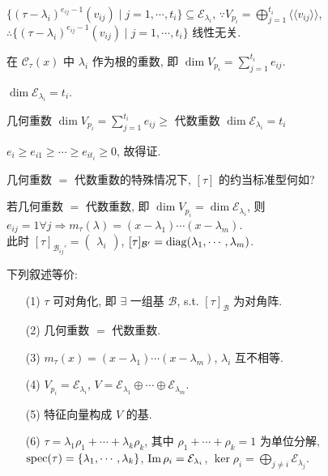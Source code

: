 \documentclass{note}
\begin{document}
$\{(\tau-\lambda_i)^{e_{ij}-1}(v_{ij})\mid j=1,\cdots,t_i\}\subseteq\mathcal{E}_{\lambda_i}$, $\because V_{p_i}=\bigoplus_{j=1}^{t_i}\langle\langle v_{ij}\rangle\rangle$, $\therefore\{(\tau-\lambda_i)^{e_{ij}-1}(v_{ij})\mid j=1,\cdots,t_i\}$ 线性无关.

\begin{df}[代数重数]
    在 $\mathcal{C}_{\tau}(x)$ 中 $\lambda_i$ 作为根的重数, 即 $\dim V_{p_i}=\sum_{j=1}^{t_i}e_{ij}$.
\end{df}

\begin{df}[几何重数]
    $\dim\mathcal{E}_{\lambda_i}=t_i$.
\end{df}

\begin{thm}[(课本定理 8.5)]
    几何重数 $\dim V_{p_i}=\sum_{j=1}^{t_i}e_{ij}\geq$ 代数重数 $\dim\mathcal{E}_{\lambda_i}=t_i$
\end{thm}
\begin{pf}
    $e_i\geq e_{i1}\geq\cdots\geq e_{it_i}\geq 0$, 故得证.
\end{pf}

几何重数 $=$ 代数重数的特殊情况下, $[\tau]$ 的约当标准型何如?

若几何重数 $=$ 代数重数, 即 $\dim V_{p_i}=\dim\mathcal{E}_{\lambda_i}$, 则 $e_{ij}=1\forall j\Longrightarrow m_{\tau}(\lambda)=(x-\lambda_1)\cdots(x-\lambda_m)$.\\
此时 $[\tau]_{\mathcal{B}_{ij}'}=\begin{pmatrix}
    \lambda_i
\end{pmatrix}$, $[\tau]_{\mathcal{B}'}=\operatorname{diag}(\lambda_1,\cdots,\lambda_m)$.

\begin{thm}[(课本定理 8.10, 8.11, 8.18)]\label{thm-8.10-8.11-8.18}
    下列叙述等价:
    \begin{itemize}
        \item[(1)] $\tau$ 可对角化, 即 $\exists$ 一组基 $\mathcal{B}$, s.t. $[\tau]_{\mathcal{B}}$ 为对角阵.
        \item[(2)] 几何重数 $=$ 代数重数.
        \item[(3)] $m_{\tau}(x)=(x-\lambda_1)\cdots(x-\lambda_m)$, $\lambda_i$ 互不相等.
        \item[(4)] $V_{p_i}=\mathcal{E}_{\lambda_i}$, $V=\mathcal{E}_{\lambda_1}\oplus\cdots\oplus\mathcal{E}_{\lambda_m}$.
        \item[(5)] 特征向量构成 $V$ 的基.
        \item[(6)] $\tau=\lambda_1\rho_1+\cdots+\lambda_k\rho_k$, 其中 $\rho_1+\cdots+\rho_k=1$ 为单位分解, $\operatorname{spec}(\tau)=\{\lambda_1,\cdots,\lambda_k\}$, $\operatorname{Im}\rho_i=\mathcal{E}_{\lambda_i}$, $\ker\rho_i=\bigoplus_{j\neq i}\mathcal{E}_{\lambda_j}$.
    \end{itemize}
\end{thm}
\end{document}
